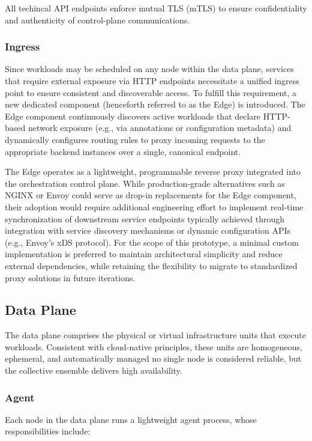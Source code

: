 All techincal API endpoints enforce mutual TLS (mTLS) to ensure confidentiality and authenticity of control-plane communications.

\subsubsection{Ingress}

Since workloads may be scheduled on any node within the data plane, services that require external exposure via HTTP endpoints necessitate a unified ingress point to ensure consistent and discoverable access. To fulfill this requirement, a new dedicated component (henceforth referred to as the Edge) is introduced. The Edge component continuously discovers active workloads that declare HTTP-based network exposure (e.g., via annotations or configuration metadata) and dynamically configures routing rules to proxy incoming requests to the appropriate backend instances over a single, canonical endpoint.

The Edge operates as a lightweight, programmable reverse proxy integrated into the orchestration control plane. While production-grade alternatives such as NGINX or Envoy could serve as drop-in replacements for the Edge component, their adoption would require additional engineering effort to implement real-time synchronization of downstream service endpoints typically achieved through integration with service discovery mechanisms or dynamic configuration APIs (e.g., Envoy’s xDS protocol). For the scope of this prototype, a minimal custom implementation is preferred to maintain architectural simplicity and reduce external dependencies, while retaining the flexibility to migrate to standardized proxy solutions in future iterations.

\subsection{Data Plane}

The data plane comprises the physical or virtual infrastructure units that execute workloads. Consistent with cloud-native principles, these units are homogeneous, ephemeral, and automatically managed  no single node is considered reliable, but the collective ensemble delivers high availability.

\subsubsection{Agent}
Each node in the data plane runs a lightweight agent process, whose responsibilities include:

